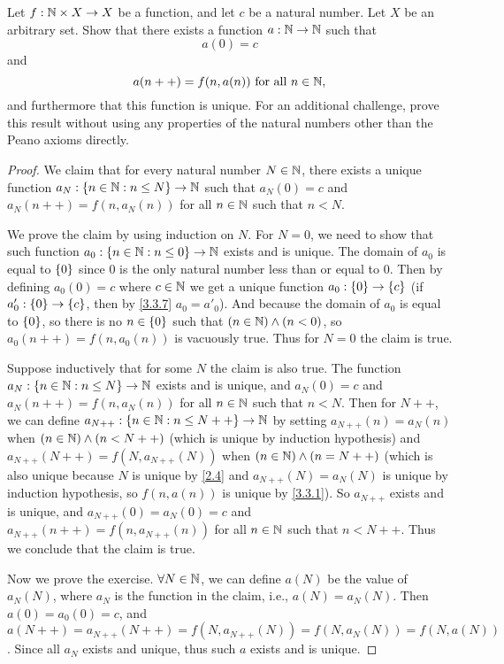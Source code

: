 \begin{ex}\label{ex:3.5.12}
	Let \(f : \mathbb{N} \times X \to X\) be a function, and let \(c\) be a natural number.
	Let \(X\) be an arbitrary set.
	Show that there exists a function \(a : \mathbb{N} \to \mathbb{N}\) such that
	\[
		a(0) = c
	\]
	and
	\[
		a(n++) = f(n, a(n)) \text{ for all } n \in \mathbb{N},
	\]
	and furthermore that this function is unique.
	For an additional challenge, prove this result without using any properties of the natural numbers other than the Peano axioms directly.
\end{ex}

\begin{proof}
	We claim that for every natural number \(N \in \mathbb{N}\), there exists a unique function \(a_N : \left\lbrace n \in \mathbb{N} : n \leq N\right\rbrace \to \mathbb{N}\) such that \(a_N(0) = c\) and \(a_N(n++) = f(n, a_{N}(n))\) for all \(n \in \mathbb{N}\) such that \(n < N\).

	We prove the claim by using induction on \(N\).
	For \(N = 0\), we need to show that such function \(a_0 : \left\lbrace n \in \mathbb{N} : n \leq 0\right\rbrace \to \mathbb{N}\) exists and is unique.
	The domain of \(a_0\) is equal to \(\left\lbrace0\right\rbrace\) since \(0\) is the only natural number less than or equal to \(0\).
	Then by defining \(a_0(0) = c\) where \(c \in \mathbb{N}\) we get a unique function \(a_0 : \left\lbrace0\right\rbrace \to \left\lbrace c\right\rbrace\) (if \(a'_0 : \left\lbrace0\right\rbrace \to \left\lbrace c\right\rbrace\), then by \cref{3.3.7} \(a_0 = a'_0\)).
	And because the domain of \(a_0\) is equal to \(\left\lbrace0\right\rbrace\), so there is no \(n \in \left\lbrace0\right\rbrace\) such that \((n \in \mathbb{N}) \land (n < 0)\), so \(a_0(n++) = f(n, a_0(n))\) is vacuously true.
	Thus for \(N = 0\) the claim is true.

	Suppose inductively that for some \(N\) the claim is also true.
	The function \(a_N : \left\lbrace n \in \mathbb{N} : n \leq N\right\rbrace \to \mathbb{N}\) exists and is unique, and \(a_N(0) = c\) and \(a_N(n++) = f(n, a_N(n))\) for all \(n \in \mathbb{N}\) such that \(n < N\).
	Then for \(N++\), we can define \(a_{N++} : \left\lbrace n \in \mathbb{N} : n \leq N++\right\rbrace \to \mathbb{N}\) by setting \(a_{N++}(n) = a_N(n)\) when \((n \in \mathbb{N}) \land (n < N++)\) (which is unique by induction hypothesis) and \(a_{N++}(N++) = f(N, a_{N++}(N))\) when \((n \in \mathbb{N}) \land (n = N++)\) (which is also unique because \(N\) is unique by \cref{2.4} and \(a_{N++}(N) = a_N(N)\) is unique by induction hypothesis, so \(f(n, a(n))\) is unique by \cref{3.3.1}).
	So \(a_{N++}\) exists and is unique, and \(a_{N++}(0) = a_N(0) = c\) and \(a_{N++}(n++) = f(n, a_{N++}(n))\) for all \(n \in \mathbb{N}\) such that \(n < N++\).
	Thus we conclude that the claim is true.

	Now we prove the exercise.
	\(\forall N \in \mathbb{N}\), we can define \(a(N)\) be the value of \(a_N(N)\), where \(a_N\) is the function in the claim, i.e., \(a(N) = a_{N}(N)\).
	Then \(a(0) = a_0(0) = c\), and \(a(N++) = a_{N++}(N++) = f(N, a_{N++}(N)) = f(N, a_{N}(N)) = f(N, a(N))\).
	Since all \(a_N\) exists and unique, thus such \(a\) exists and is unique.


\end{proof}
